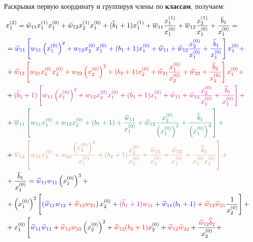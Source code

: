 \documentclass{report}
\begin{document}
\par Раскрывая первую координату и группируя члены по \textbf{классам}, получаем:
{\allowdisplaybreaks
\begin{align}
    &x^{(2)}_1 = \widetilde{w}_{11}x_1^{(1)}x_1^{(0)} + \widetilde{w}_{12}x_2^{(1)}x_1^{(0)} + (\widetilde{b}_1 + 1)x_1^{(1)} + 
    \overline{w}_{11}\frac{x_1^{(1)}}{x_1^{(0)}}+\overline{w}_{12}\frac{x_2^{(1)}}{x_1^{(0)}} + \frac{\overline{b}_1}{x_1^{(0)}}=\nonumber\\
    &=\color{blue}\widetilde{w}_{11}\left[w_{11}\left(x_1^{(0)}\right)^2 + w_{12}x_2^{(0)}x_1^{(0)} + (b_1 + 1)x_1^{(0)} + \widehat{w}_{11}+\widehat{w}_{12}\frac{x_2^{(0)}}{x_1^{(0)}} + \frac{\widehat{b}_1}{x_1^{(0)}}\right]x_1^{(0)} + \nonumber\\
    &+\color{red}\widetilde{w}_{12}\left[w_{21}x_1^{(0)}x_2^{(0)} + w_{22}\left(x_2^{(0)}\right)^2 + (b_2 + 1)x_2^{(0)} + \widehat{w}_{21}\frac{x_1^{(0)}}{x_2^{(0)}}+\widehat{w}_{22} + \frac{\widehat{b}_2}{x_2^{(0)}}\right]x_1^{(0)} + \nonumber\\
    &+\color{magenta}(\widetilde{b}_1 + 1)\left[w_{11}\left(x_1^{(0)}\right)^2 + w_{12}x_2^{(0)}x_1^{(0)} + (b_1 + 1)x_1^{(0)} + \widehat{w}_{11}+\widehat{w}_{12}\frac{x_2^{(0)}}{x_1^{(0)}} + \frac{\widehat{b}_1}{x_1^{(0)}}\right] + \nonumber\\
    &+\color{PineGreen}\overline{w}_{11}\left[w_{11}x_1^{(0)} + w_{12}x_2^{(0)} + (b_1 + 1) + \frac{\widehat{w}_{11}}{x_1^{(0)}}+\widehat{w}_{12}\frac{x_2^{(0)}}{\left(x_1^{(0)}\right)^2} + \frac{\widehat{b}_1}{\left(x_1^{(0)}\right)^2}\right] + \nonumber\\
    &+\color{Tan}\overline{w}_{12}\left[w_{21}x_2^{(0)} + w_{22}\frac{\left(x_2^{(0)}\right)^2}{x_1^{(0)}} + (b_2 + 1)\frac{x_2^{(0)}}{x_1^{(0)}} + \frac{\widehat{w}_{21}}{x_2^{(0)}}+\frac{\widehat{w}_{22}}{x_1^{(0)}} + \frac{\widehat{b}_2}{x_1^{(0)}x_2^{(0)}}\right]+\nonumber\\
    &+\frac{\overline{b}_1}{x_1^{(0)}}=\color{blue}\widetilde{w}_{11}w_{11}\color{black}\left(x_1^{(0)}\right)^3 + \nonumber\\
    &+\left(x_1^{(0)}\right)^2\left[\left(\color{blue}\widetilde{w}_{11} w_{12}\color{black} + \color{red}\widetilde{w}_{12} w_{21}\color{black}\right)x_2^{(0)} + \color{magenta}(\widetilde{b}_1+1)w_{11}\color{black} + \color{blue}\widetilde{w}_{11}(b_1 + 1)\color{black} + \color{red}\widetilde{w}_{12}\widehat{w}_{21}\color{black}\frac{1}{x_2^{(0)}}\right] + \nonumber\\
    &+x_1^{(0)}\left[\color{blue}\widetilde{w}_{11}\widehat{w}_{11}\color{black} + \color{red}\widetilde{w}_{12}w_{22}\color{black}\left(x_2^{(0)}\right)^2 + \color{red}\widetilde{w}_{12}(b_2+1)\color{black}x_2^{(0)} + \color{red}\widetilde{w}_{12}\widehat{w}_{22}\color{black}+\color{red}\color{black}\frac{\color{red}\widetilde{w}_{12}\widehat{b}_{2}}{x_2^{(0)}}+\right.\nonumber\\

\end{align}}
\end{document}
